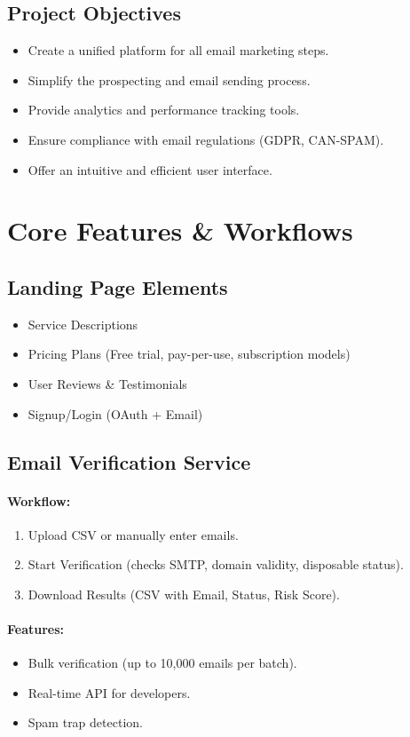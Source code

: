 \documentclass{article}
\begin{document}
\subsection{Project Objectives}
\begin{itemize}
    \item Create a unified platform for all email marketing steps.
    \item Simplify the prospecting and email sending process.
    \item Provide analytics and performance tracking tools.
    \item Ensure compliance with email regulations (GDPR, CAN-SPAM).
    \item Offer an intuitive and efficient user interface.
\end{itemize}

\section{Core Features \& Workflows}
\subsection{Landing Page Elements}
\begin{itemize}
    \item Service Descriptions
    \item Pricing Plans (Free trial, pay-per-use, subscription models)
    \item User Reviews \& Testimonials
    \item Signup/Login (OAuth + Email)
\end{itemize}

\subsection{Email Verification Service}
\paragraph{Workflow:}
\begin{enumerate}
    \item Upload CSV or manually enter emails.
    \item Start Verification (checks SMTP, domain validity, disposable status).
    \item Download Results (CSV with Email, Status, Risk Score).
\end{enumerate}

\paragraph{Features:}
\begin{itemize}
    \item Bulk verification (up to 10,000 emails per batch).
    \item Real-time API for developers.
    \item Spam trap detection.
\end{itemize}
\end{document}
